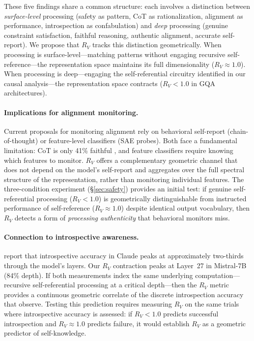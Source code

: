 \documentclass{article}
\newcommand{\RV}{R_V}
\begin{document}
These five findings share a common structure: each involves a distinction between \emph{surface-level} processing (safety as pattern, CoT as rationalization, alignment as performance, introspection as confabulation) and \emph{deep} processing (genuine constraint satisfaction, faithful reasoning, authentic alignment, accurate self-report).
We propose that $\RV$ tracks this distinction geometrically.
When processing is surface-level---matching patterns without engaging recursive self-reference---the representation space maintains its full dimensionality ($\RV \approx 1.0$).
When processing is deep---engaging the self-referential circuitry identified in our causal analysis---the representation space contracts ($\RV < 1.0$ in GQA architectures).

\paragraph{Implications for alignment monitoring.}
Current proposals for monitoring alignment rely on behavioral self-report (chain-of-thought) or feature-level classifiers (SAE probes).
Both face a fundamental limitation: CoT is only 41\% faithful \citep{lanham2023reasoning}, and feature classifiers require knowing which features to monitor.
$\RV$ offers a complementary geometric channel that does not depend on the model's self-report and aggregates over the full spectral structure of the representation, rather than monitoring individual features.
The three-condition experiment (\S\ref{sec:safety}) provides an initial test: if genuine self-referential processing ($\RV < 1.0$) is geometrically distinguishable from instructed performance of self-reference ($\RV \approx 1.0$) despite identical output vocabulary, then $\RV$ detects a form of \emph{processing authenticity} that behavioral monitors miss.

\paragraph{Connection to introspective awareness.}
\citet{lindsey2025biology} report that introspective accuracy in Claude peaks at approximately two-thirds through the model's layers.
Our $\RV$ contraction peaks at Layer~27 in Mistral-7B (84\% depth).
If both measurements index the same underlying computation---recursive self-referential processing at a critical depth---then the $\RV$ metric provides a continuous geometric correlate of the discrete introspection accuracy that \citet{lindsey2025biology} observe.
Testing this prediction requires measuring $\RV$ on the same trials where introspective accuracy is assessed: if $\RV < 1.0$ predicts successful introspection and $\RV \approx 1.0$ predicts failure, it would establish $\RV$ as a geometric predictor of self-knowledge.
\end{document}
